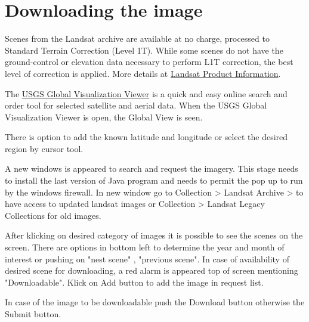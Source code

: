 \section{Downloading the image}
Scenes from the Landsat archive are available at no charge, processed to Standard Terrain Correction (Level 1T). While some scenes do not have the ground-control or elevation data necessary to perform L1T correction, the best level of correction is applied. More details at \href{http://landsat.usgs.gov/products_productinformation.php}{Landsat Product Information}.\newline

The \href{http://glovis.usgs.gov/BrowseBrowser.shtml}{USGS Global Visualization Viewer} is a quick and easy online search and order tool for selected satellite and aerial data. When the USGS Global Visualization Viewer is open, the Global View is seen.\newline

There is option to add the known latitude and longitude or select the desired region by cursor tool.\newline

A new windows is appeared to search and request the imagery. This stage needs to install the last version of Java program and needs to permit the pop up to run by the windows firewall.
In new window go to Collection > Landsat Archive > to have access to updated landsat images or Collection > Landsat Legacy Collections for old images.\newline

After klicking on desired  category of  images it is possible to see the scenes on the screen. There are options in bottom left to determine the year and month of interest or pushing on "nest scene" , "previous scene". In case of availability of desired scene for downloading, a red alarm is appeared top of screen mentioning "Downloadable".  Klick on Add button to add the image in request list.\newline

In case of the image to be downloadable push the Download button otherwise the Submit button.\newline  

